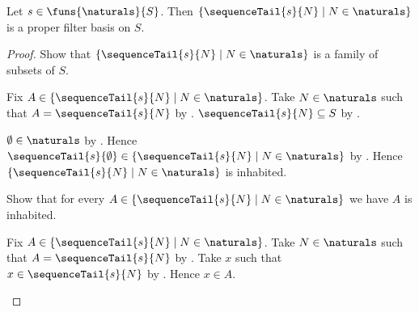 \begin{theorem}\label{sequence_tail_family_is_proper_filter_basis}
    Let $s\in\funs{\naturals}{S}$.
    Then $\{\sequenceTail{s}{N}\mid N\in\naturals\}$
        is a proper filter basis on $S$.
\end{theorem}
\begin{proof}
    Show that $\{\sequenceTail{s}{N}\mid N\in\naturals\}$
        is a family of subsets of $S$.
    \begin{subproof}
        Fix $A\in\{\sequenceTail{s}{N}\mid N\in\naturals\}$.
        Take $N\in\naturals$ such that $A=\sequenceTail{s}{N}$
            by .
        $\sequenceTail{s}{N}\subseteq S$ by .
    \end{subproof}
    $\emptyset\in\naturals$ by .
    Hence $\sequenceTail{s}{\emptyset}\in
        \{\sequenceTail{s}{N}\mid N\in\naturals\}$ by
        .
    Hence $\{\sequenceTail{s}{N}\mid N\in\naturals\}$ is inhabited.

    Show that for every
        $A\in\{\sequenceTail{s}{N}\mid N\in\naturals\}$
        we have $A$ is inhabited.
    \begin{subproof}
        Fix $A\in\{\sequenceTail{s}{N}\mid N\in\naturals\}$.
        Take $N\in\naturals$ such that
            $A=\sequenceTail{s}{N}$ by .
        Take $x$ such that $x\in\sequenceTail{s}{N}$ by
            .
        Hence $x\in A$.
    \end{subproof}


\end{proof}
